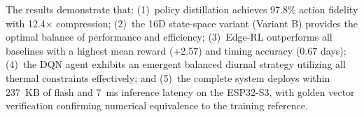     The results demonstrate that: (1)~policy distillation achieves 97.8\% action fidelity with 12.4$\times$ compression; (2)~the 16D state-space variant (Variant B) provides the optimal balance of performance and efficiency; (3)~Edge-RL outperforms all baselines with a highest mean reward (+2.57) and timing accuracy (0.67 days); (4)~the DQN agent exhibits an emergent balanced diurnal strategy utilizing all thermal constraints effectively; and (5)~the complete system deploys within 237~KB of flash and 7~ms inference latency on the ESP32-S3, with golden vector verification confirming numerical equivalence to the training reference.